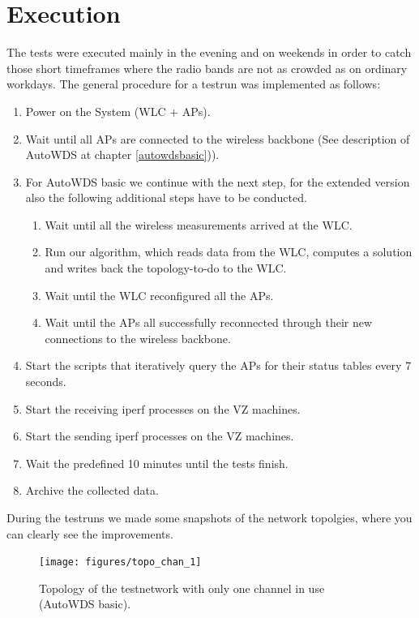\newpage
    
  \section{Execution}
    The tests were executed mainly in the evening and on weekends in order to catch those short timeframes where the radio bands are not as crowded as on ordinary workdays.
    The general procedure for a testrun was implemented as follows:
    \begin{enumerate}
      \item Power on the System (WLC + APs).
      \item Wait until all APs are connected to the wireless backbone (See description of AutoWDS at chapter \ref{autowdsbasic})).
      \item For AutoWDS basic we continue with the next step, for the extended version also the following additional steps have to be conducted.
	\begin{enumerate}
	 \item Wait until all the wireless measurements arrived at the \ac{WLC}.
	 \item Run our algorithm, which reads data from the WLC, computes a solution and writes back the topology-to-do to the WLC.
	 \item Wait until the WLC reconfigured all the APs.
	 \item Wait until the APs all successfully reconnected through their new connections to the wireless backbone.
	\end{enumerate}
      \item Start the scripts that iteratively query the APs for their status tables every 7 seconds.
      \item Start the receiving iperf processes on the VZ machines.
      \item Start the sending iperf processes on the VZ machines.
      \item Wait the predefined 10 minutes until the tests finish.
      \item Archive the collected data.
    \end{enumerate}
    
\newpage

    During the testruns we made some snapshots of the network topolgies, where you can clearly see the improvements.    
    \begin{figure}[h!]
      \centering
	\texttt{[image: figures/topo\_chan\_1]}%
	\caption{Topology of the testnetwork with only one channel in use (AutoWDS basic).\protect\footnotemark }
      \label{fig:topo_chan_1}
    \end{figure}
    
